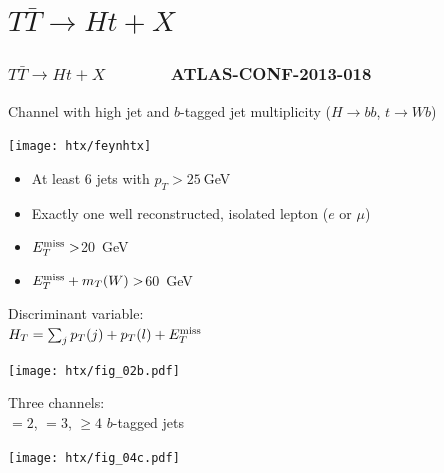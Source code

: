 \documentclass[xcolor=dvipsnames,10pt]{beamer}
\begin{document}
\section{$T\bar{T}\to Ht+X$}

\begin{frame}\frametitle{$T\bar{T}\to Ht+X\qquad\qquad$\small ATLAS-CONF-2013-018~\cite{ATLAS-CONF-2013-018}}
\footnotesize\centering

Channel with high jet and $b$-tagged jet multiplicity ($H\to bb$, $t\to Wb$)

  \begin{minipage}{.55\textwidth}\scriptsize\centering

       \texttt{[image: htx/feynhtx]}

  \begin{minipage}{.4\textwidth}\tiny\centering

       \begin{itemize}
\item At least 6 jets with $p_T>25~$GeV
\item Exactly one well reconstructed, isolated lepton ($e$ or $\mu$)
\item ${E}^{\rm miss}_T >$20~GeV
\item ${E}^{\rm miss}_T + m_T(W)>$60~GeV
       \end{itemize}

\end{minipage}\begin{minipage}{.6\textwidth}\centering

\myskip

\alert{Discriminant variable}: \\$H_T=\sum_j p_T(j) + p_T(l) + {E}^{\rm miss}_T$

       \texttt{[image: htx/fig\_02b.pdf]}


\end{minipage}

     \end{minipage}\begin{minipage}{.45\textwidth}\centering


\begin{minipage}{1.\textwidth}\centering

\myskip

       Three channels:\\ $=2$, $=3$, \alert{$\geq 4$ $b$-tagged jets}

       \texttt{[image: htx/fig\_04c.pdf]}

     \end{minipage}
\end{minipage}

\end{frame}
\end{document}

